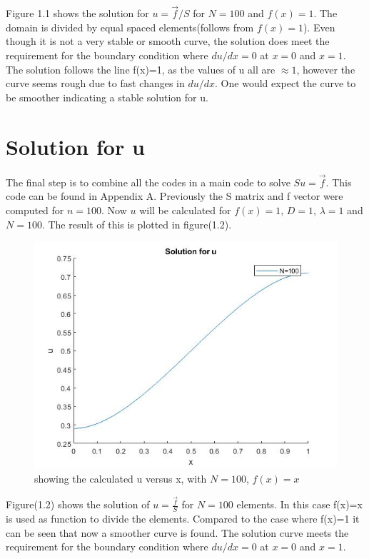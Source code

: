 \documentclass[a4paper]{report}
\begin{document}
Figure 1.1 shows the solution for $u=\vec{f}/S$ for $N=100$ and $f(x)=1$. The domain is divided by equal spaced elements(follows from $f(x)=1$). Even though it is not a very stable or smooth curve, the solution does meet the requirement for the boundary condition where $du/dx=0$ at $x=0$ and $x=1$. The solution follows the line f(x)=1, as tbe values of u all are $\approx1$, however the curve seems rough due to fast changes in $du/dx$. One would expect the curve to be smoother indicating a stable solution for u.  

\section{Solution for u}
The final step is to combine all the codes in a main code to solve $Su= \vec{f}$. This code can be found in Appendix A. Previously the S matrix and f vector were computed for $n = 100$. Now $u$ will be calculated for $f(x)=1$, $D=1$, $\lambda = 1$ and $N = 100$. The result of this is plotted in figure(1.2). 


\begin{figure}[ht!]
	\centering
	\includegraphics[width=130mm]{1Dfx.jpg}
	\caption{showing the calculated u versus x, with $N = 100$, $f(x)=x$		 \label{overflow}}
\end{figure}

Figure(1.2) shows the solution of $u=\frac{\vec{f}}{S}$ for $N=100$ elements. In this case f(x)=x is used as function to divide the elements. Compared to the case where f(x)=1 it can be seen that now a smoother curve is found. The solution curve meets the requirement for the boundary condition where $du/dx=0$ at $x=0$ and $x=1$.
\end{document}
